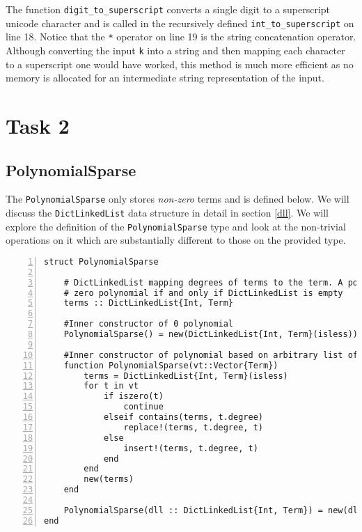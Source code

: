 \documentclass{article}
\theoremstyle{plain}
\numberwithin{theorem}{section}
\numberwithin{example}{section}
\theoremstyle{definition}
\numberwithin{definition}{section}
\begin{document}
The function \texttt{digit\_to\_superscript} converts a single digit to a
superscript unicode character and is called in the recursively defined
\texttt{int\_to\_superscript} on line 18. Notice that the \texttt{*} operator on
line 19 is the string concatenation operator. Although converting the input
\texttt{k} into a string and then mapping each character to a superscript one
would have worked, this method is much more efficient as no memory is allocated
for an intermediate string representation of the input.

\bigbreak

\section{Task 2}
\subsection{PolynomialSparse}
The \texttt{PolynomialSparse} only stores \emph{non-zero} terms and is defined
below. We will discuss the \texttt{DictLinkedList} data structure in detail in
section \ref{dll}. We will explore the definition of the
\texttt{PolynomialSparse} type and look at the non-trivial operations on it
which are substantially different to those on the provided type.

\begin{codebox}
    \begin{Verbatim}[numbers=left,xleftmargin=5mm]
struct PolynomialSparse

    # DictLinkedList mapping degrees of terms to the term. A polynomial is the
    # zero polynomial if and only if DictLinkedList is empty
    terms :: DictLinkedList{Int, Term}
    
    #Inner constructor of 0 polynomial
    PolynomialSparse() = new(DictLinkedList{Int, Term}(isless))

    #Inner constructor of polynomial based on arbitrary list of terms
    function PolynomialSparse(vt::Vector{Term})
        terms = DictLinkedList{Int, Term}(isless)
        for t in vt
            if iszero(t)
                continue
            elseif contains(terms, t.degree)
                replace!(terms, t.degree, t)
            else
                insert!(terms, t.degree, t)
            end
        end
        new(terms)
    end

    PolynomialSparse(dll :: DictLinkedList{Int, Term}) = new(dll)
end
    \end{Verbatim}
\end{codebox}
\end{document}
